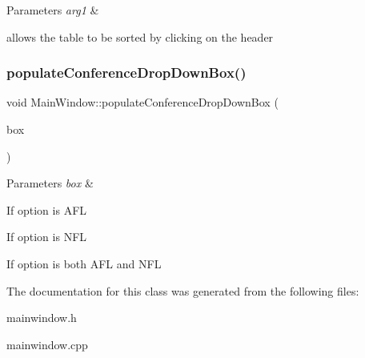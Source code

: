 \begin{DoxyParams}{Parameters}
{\em arg1} & \\
\hline
\end{DoxyParams}
allows the table to be sorted by clicking on the header \mbox{\label{class_main_window_adc0662d3cc64fcb561bfd6ac8b09726c}} 
\subsubsection{\texorpdfstring{populate\+Conference\+Drop\+Down\+Box()}{populateConferenceDropDownBox()}}
{\footnotesize\ttfamily void Main\+Window\+::populate\+Conference\+Drop\+Down\+Box (\begin{DoxyParamCaption}\item[{Q\+String}]{box }\end{DoxyParamCaption})}


\begin{DoxyParams}{Parameters}
{\em box} & \\
\hline
\end{DoxyParams}
If option is A\+FL

If option is N\+FL

If option is both A\+FL and N\+FL 

The documentation for this class was generated from the following files\+:\begin{DoxyCompactItemize}
\item 
mainwindow.\+h\item 
mainwindow.\+cpp\end{DoxyCompactItemize}
